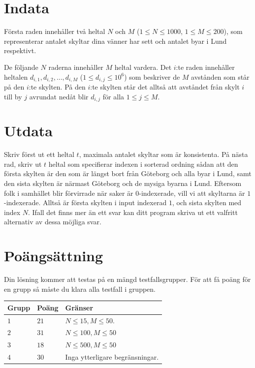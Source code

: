 \noindent
\section*{Indata}
Första raden innehåller två heltal $N$ och $M$ ($1 \leq N \leq 1000$, $1 \leq M \leq 200$),
som representerar antalet skyltar dina vänner har sett och antalet byar i Lund respektivt.

De följande $N$ raderna innehåller $M$ heltal vardera. Det $i$:te raden innehåller heltalen $d_{i,1}, d_{i,2}, \ldots, d_{i,M}$ ($1 \leq d_{i,j} \leq 10^6$) som beskriver de $M$ avstånden som står på den $i$:te skylten. 
På den $i$:te skylten står det alltså att avståndet från skylt $i$ till by $j$ avrundat nedåt blir $d_{i,j}$ för alla $1 \leq j \leq M$.


\section*{Utdata}
Skriv först ut ett heltal $t$, maximala antalet skyltar som är konsistenta. 
På nästa rad, skriv ut $t$ heltal som specifierar indexen i sorterad ordning sådan att den 
första skylten är den som är längst bort från Göteborg och alla byar i Lund, samt den sista skylten är närmast Göteborg och de mysiga byarna i Lund.
Eftersom folk i samhället blir förvirrade när saker är $0$-indexerade, vill vi att skyltarna är $1$-indexerade. Alltså är första skylten i input indexerad $1$, och sista skylten med index $N$.
Ifall det finns mer än ett svar kan ditt program skriva ut ett valfritt alternativ av dessa möjliga svar.

\section*{Poängsättning}
Din lösning kommer att testas på en mängd testfallsgrupper.
För att få poäng för en grupp så måste du klara alla testfall i gruppen.

\noindent
\begin{tabular}{| l | l | p{12cm} |}
  \hline
  \textbf{Grupp} & \textbf{Poäng} & \textbf{Gränser} \\ \hline
  $1$    & $21$         & $N \leq 15, M \leq 50$.  \\ \hline
  $2$    & $31$         & $N \leq 100, M \leq 50$ \\ \hline
  $3$    & $18$         & $N \leq 500, M \leq 50$ \\ \hline
  $4$    & $30$         & Inga ytterligare begränsningar. \\ \hline
\end{tabular}



